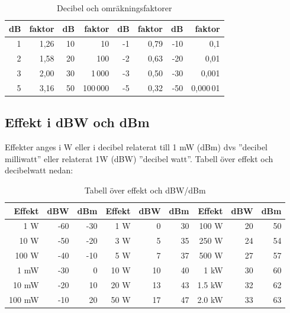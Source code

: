 \begin{table}[h]
\centering
\begin{tabular}{rr|rr|rr|rr}
	\bf dB & \bf faktor & \bf dB & \bf faktor & \bf dB & \bf faktor & \bf dB & \bf faktor \\ \hline
	     1 &       1,26 &     10 &         10 &     -1 &       0,79 &    -10 &        0,1 \\
	     2 &       1,58 &     20 &        100 &     -2 &       0,63 &    -20 &       0,01 \\
	     3 &       2,00 &     30 &     1\,000 &     -3 &       0,50 &    -30 &      0,001 \\
	     5 &       3,16 &     50 &   100\,000 &     -5 &       0,32 &    -50 &  0,000\,01
\end{tabular}
\caption{Decibel och omräkningsfaktorer}
\end{table}

\subsection{Effekt i dBW och dBm}
 

Effekter anges i W eller i decibel relaterat till 1 mW (dBm) dvs ''decibel
milliwatt'' eller relaterat 1W (dBW) ''decibel watt''. Tabell över effekt och
decibelwatt nedan:

\begin{table}[H]
\centering
\begin{tabular}{rrr|rrr|rrr}
	\textbf{Effekt} & \textbf{dBW} & \textbf{dBm} & \textbf{Effekt} & \textbf{dBW} & \textbf{dBm} & \textbf{Effekt} & \textbf{dBW} & \textbf{dBm} \\ \hline
	    1 \textmu W &          -60 &          -30 &             1 W &            0 &           30 &           100 W &           20 &           50 \\
	   10 \textmu W &          -50 &          -20 &             3 W &            5 &           35 &           250 W &           24 &           54 \\
	  100 \textmu W &          -40 &          -10 &             5 W &            7 &           37 &           500 W &           27 &           57 \\
	           1 mW &          -30 &            0 &            10 W &           10 &           40 &            1 kW &           30 &           60 \\
	          10 mW &          -20 &           10 &            20 W &           13 &           43 &          1.5 kW &           32 &           62 \\
	         100 mW &          -10 &           20 &            50 W &           17 &           47 &          2.0 kW &           33 &           63
\end{tabular}
\caption{Tabell över effekt och dBW/dBm}
\end{table}

